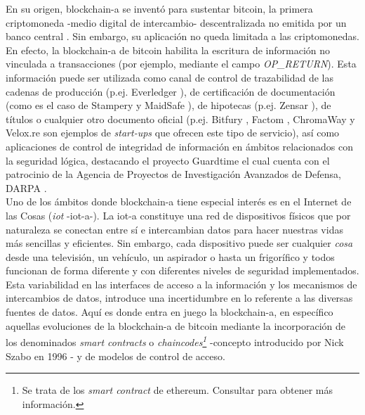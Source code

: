 \documentclass[12pt,a4paper, twoside]{report}
\begin{document}
	En su origen, \gls{blockchain-a} se inventó para sustentar \gls{bitcoin}, la primera criptomoneda -medio digital de intercambio- descentralizada no emitida por un banco central 	\cite{franco:2014:UB}. Sin embargo, su aplicación no queda limitada a las criptomonedas. En efecto, la \gls{blockchain-a} de \gls{bitcoin} habilita la escritura de información no vinculada a transacciones (por ejemplo, mediante el campo \textit{OP\_RETURN}). Esta información puede ser utilizada como canal de control de trazabilidad de las cadenas de producción (p.ej. Everledger \cite{everledger}), de certificación de documentación (como es el caso de Stampery \cite{stampery} y MaidSafe \cite{maidsafe}), de hipotecas (p.ej. Zensar \cite{zensar}), de títulos o cualquier otro documento oficial (p.ej. Bitfury \cite{bitfury}, Factom \cite{factom}, ChromaWay \cite{chromaway} y Velox.re \cite{velox} son ejemplos de \textit{start-ups} que ofrecen este tipo de servicio), así como aplicaciones de control de integridad de información en ámbitos relacionados con la seguridad lógica, destacando el proyecto Guardtime \cite{guardtime} el cual cuenta con el patrocinio de la Agencia de Proyectos de Investigación Avanzados de Defensa, DARPA \cite{darpa}. \\

	Uno de los ámbitos donde \gls{blockchain-a} tiene especial interés es en el Internet de las Cosas (\textit{\gls{iot}} -\gls{iot-a}-). La \gls{iot-a} constituye una red de dispositivos físicos que por naturaleza se conectan entre sí e intercambian datos para hacer nuestras vidas más sencillas y eficientes. Sin embargo, cada dispositivo puede ser cualquier \textit{cosa} desde una televisión, un vehículo, un aspirador o hasta un frigorífico y todos funcionan de forma diferente y con diferentes niveles de seguridad implementados. Esta variabilidad en las interfaces de acceso a la información y los mecanismos de intercambios de datos, introduce una incertidumbre en lo referente a las diversas fuentes de datos. Aquí es donde entra en juego la \gls{blockchain-a}, en específico aquellas evoluciones de la \gls{blockchain-a} de \gls{bitcoin} mediante la incorporación de los denominados \textit{smart contracts} o \textit{\glspl{chaincode}\footnote{Se trata de los \textit{smart contract} de \gls{ethereum}. Consultar \cite{ethereum} para obtener más información.}} -concepto introducido por Nick Szabo en 1996 \cite{szabo:1997:FSRPN}- y de modelos de control de acceso.	\\
	
\end{document}
